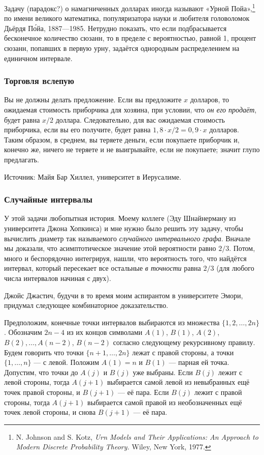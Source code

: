 Задачу (парадокс?) о намагниченных долларах иногда называют «Урной Пойа»,\footnote{N. Johnson and S. Kotz, \emph{Urn Models and Their Applications: An Approach to Modern Discrete Probability Theory.} Wiley, New York, 1977.} по имени великого математика, популяризатора науки и любителя головоломок Дьёрдя П\'{о}йа, 1887---1985.
Нетрудно показать, что если подбрасывается бесконечное количество сюзанн, то в пределе с вероятностью, равной 1, процент сюзанн, попавших в первую урну, задаётся однородным распределением на единичном интервале.

\subsubsection*{Торговля вслепую}%

Вы не должны делать предложение.
Если вы предложите $x$ долларов, то ожидаемая стоимость приборчика для хозяина, при условии, что \emph{он его продаёт}, будет равна $x/2$ доллара.
Следовательно, для вас ожидаемая стоимость приборчика, если вы его получите, будет равна $1{,}8 {\cdot} x/2=0{,}9{\cdot}x$ долларов.
Таким образом, в среднем, вы теряете деньги, если покупаете приборчик и, конечно же, ничего не теряете и не выигрывайте, если не покупаете;
значит глупо предлагать.
\heart

Источник: Майя Бар Хиллел, университет в Иерусалиме.

\subsubsection*{Случайные интервалы}%

У этой задачи любопытная история.
Моему коллеге (Эду Шнайнерману из университета Джона Хопкинса) и мне нужно было решить эту задачу, чтобы вычислить диаметр так называемого \emph{случайного интервального графа}. 
Вначале мы доказали, что асимптотическое значение этой вероятности равно $2/3$.
Потом, много и беспорядочно интегрируя, нашли, что вероятность того, что найдётся интервал, который пересекает все остальные \emph{в точности} равна $2/3$ (для любого числа интервалов начиная с двух).

Джойс Джастич, %
будучи в то время моим аспирантом в университете Эмори, придумал следующее комбинаторное доказательство.

\medskip

Предположим, конечные точки интервалов выбираются из множества $\{1,2,\dots,2n\}$.
Обозначим $2n-4$ из их концов символами $A(1)$, $B(1)$, $A(2)$, $B(2),\dots, A(n-2)$, $B(n-2)$ согласно следующему рекурсивному правилу.
Будем говорить что точки $\{n+1, \dots , 2n\}$ лежат с правой стороны, а точки $\{1, \dots , n\}$ --- с левой.
Положим $A(1)=n$ и $B(1)$ --- парная ей точка.
Допустим, что точки до $A(j)$ и $B(j)$ уже выбраны. 
Если $B(j)$ лежит с левой стороны, тогда $A(j+1)$ выбирается самой левой из невыбранных ещё точек правой стороны, и $B(j+1)$ --- её пара.
Если $B(j)$ лежит с правой стороны, тогда $A(j+1)$ выбирается самой правой из необозначенных ещё точек левой стороны, и снова $B(j+1)$ --- её пара.

